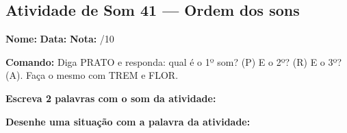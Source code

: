 \subsection{Atividade de Som 41 --- Ordem dos sons}
\begin{exercicio}



\noindent\textbf{Nome:} \underline{\hspace{3.2cm}} \quad \textbf{Data:} \underline{\hspace{1.6cm}} \quad \textbf{Nota:} \underline{\hspace{0.9cm}}/10


\noindent\textbf{Comando:} Diga PRATO e responda: qual é o 1º som? (P) E o 2º? (R) E o 3º? (A). Faça o mesmo com TREM e FLOR.


\begin{center}
\end{center}

\noindent\textbf{Escreva 2 palavras com o som da atividade:}

\begin{center}
  \underline{\hspace{3cm}} \quad \underline{\hspace{3cm}}
\end{center}

\noindent\textbf{Desenhe uma situação com a palavra da atividade:}

\begin{center}
\end{center}

\end{exercicio}




